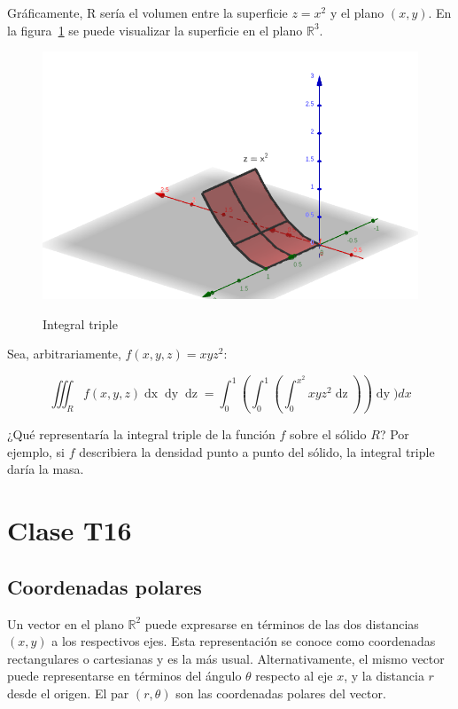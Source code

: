 \documentclass{article}
\renewcommand{\Bbb}{\mathbb}
\begin{document}
Gráficamente, R sería el volumen entre la superficie $z = x^2$ y el plano $(x, y)$. En la figura~\ref{fig:itv} se puede visualizar la superficie en el plano $\Bbb R^3$.

\begin{figure}[ht]
\centering
\caption{Integral triple}
\includegraphics[scale=0.6]{img/teo_fig021_itv.png}
\label{fig:itv}
\end{figure}

Sea, arbitrariamente, $f(x,y,z) = xyz^2$:

\begin{equation}
\iiint_R f(x,y,z) \mathop{dx} \mathop{dy} \mathop{dz} = \int_0^1 \left( \int_0^1 \left( \int_0^{x^2} xyz^2 \mathop{dz} \right)  \right) \mathop{dy}) dx
\end{equation}

¿Qué representaría la integral triple de la función $f$ sobre el sólido $R$? Por ejemplo, si $f$ describiera la densidad punto a punto del sólido, la integral triple daría la masa.

\section{Clase T16}

\subsection{Coordenadas polares}

Un vector en el plano $\Bbb R^2$ puede expresarse en términos de las dos distancias $(x,y)$ a los respectivos ejes. Esta representación se conoce como coordenadas rectangulares o cartesianas y es la más usual. Alternativamente, el mismo vector puede representarse en términos del ángulo $\theta$ respecto al eje $x$, y la distancia $r$ desde el origen. El par $(r, \theta)$ son las coordenadas polares del vector.
\end{document}
